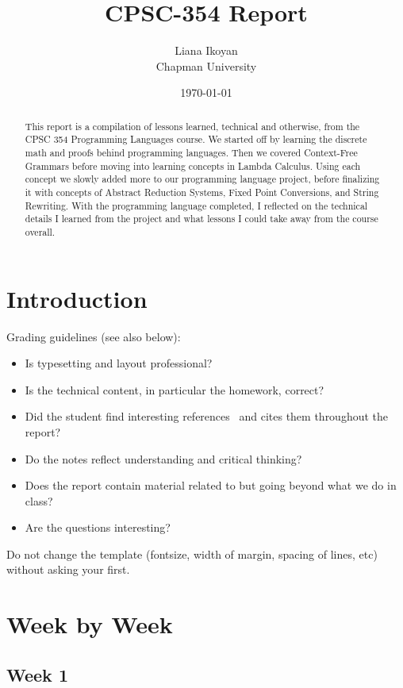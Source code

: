 \documentclass{article}
\title{CPSC-354 Report}
\author{Liana Ikoyan  \\ Chapman University}
\date{\today}
\theoremstyle{theorem}
\theoremstyle{definition}
\theoremstyle{remark}
\begin{document}
\maketitle

\begin{abstract}
This report is a compilation of lessons learned, technical and otherwise, from the CPSC 354 Programming Languages course. 
We started off by learning the discrete math and proofs behind programming languages. Then we covered Context-Free Grammars before moving into learning concepts in Lambda Calculus. Using each concept 
we slowly added more to our programming language project, before finalizing it with concepts of Abstract Reduction Systems, Fixed Point Conversions, and String Rewriting. With 
the programming language completed, I reflected on the technical details I learned from the project and what lessons I could take away from the course overall.
\end{abstract}

\setcounter{tocdepth}{3}
\tableofcontents

\section{Introduction}\label{intro}

Grading  guidelines (see also below):
\begin{itemize}
\item Is typesetting and layout professional? 
\item Is the technical content, in particular the homework, correct?
\item Did the student find interesting references~\cite{bla} and cites them throughout the report?
\item Do the notes reflect understanding and critical thinking?
\item Does the report contain material related to but going beyond what we do in class?
\item Are the questions interesting?
\end{itemize}

Do not change the template (fontsize, width of margin, spacing of lines, etc) without asking your first.

\section{Week by Week}\label{homework}

\subsection{Week 1}
\end{document}
